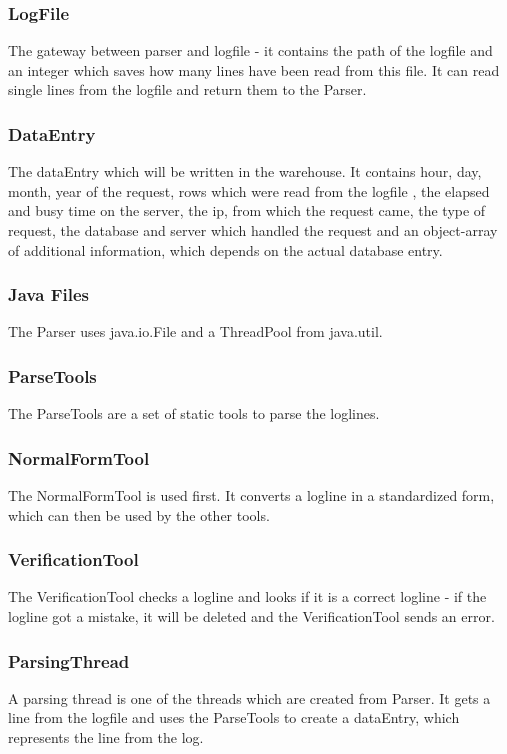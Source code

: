 \subsubsection*{LogFile}
The gateway between parser and logfile - it contains the path of the logfile and an integer 
which saves how many lines have been read from this file. It can read single lines from the logfile and return them to 
the Parser.

\subsubsection*{DataEntry}
The dataEntry which will be written in the warehouse. It contains hour, day, month, year of the request, rows which were read 
from the logfile%
, the elapsed and busy time on the server, the ip, from which the request came, the type of request, the database
and server which handled the request and an object-array of additional information, which depends on the actual database entry.%

\subsubsection*{Java Files}
The Parser uses java.io.File and a ThreadPool from java.util.

\subsubsection*{ParseTools}
The ParseTools are a set of static tools to parse the loglines.

\subsubsection*{NormalFormTool}
The NormalFormTool is used first. It converts a logline in a standardized form, which can then be used by the other tools.

\subsubsection*{VerificationTool}
The VerificationTool checks a logline and looks if it is a correct logline - if the logline got a mistake, it will 
be deleted and the VerificationTool sends an error.



\subsubsection*{ParsingThread}
A parsing thread is one of the threads which are created from Parser. It gets a line from the logfile and uses the ParseTools
to create a dataEntry, which represents the line from the log. 
